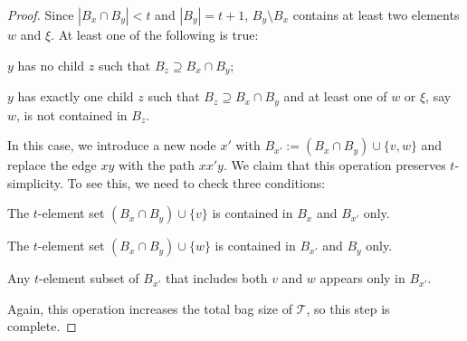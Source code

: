 \documentclass[kpfonts]{patmorin}
\theoremstyle{named}
\begin{document}
\begin{proof}
    Since $|B_x\cap B_y|<t$ and $|B_y|=t+1$, $B_y\setminus B_x$ contains at least two elements $w$ and $\xi$.  At least one of the following is true:
    \begin{inparaenum}[(i)]
        \item $y$ has no child $z$ such that $B_z\supseteq B_x\cap B_y$;
        \item $y$ has exactly one child $z$ such that $B_z\supseteq B_x\cap B_y$ and at least one of $w$ or $\xi$, say $w$, is not contained in $B_z$.
    \end{inparaenum}
    In this case, we introduce a new node $x'$ with $B_{x'}:=(B_x\cap B_y)\cup\{v,w\}$ and replace the edge $xy$ with the path $xx'y$.  We claim that this operation preserves $t$-simplicity.  To see this, we need to check three conditions:
    \begin{compactenum}
        \item The $t$-element set $(B_x\cap B_y)\cup\{v\}$ is contained in $B_x$ and $B_{x'}$ only.
        \item The $t$-element set $(B_x\cap B_y)\cup\{w\}$ is contained in $B_{x'}$ and $B_y$ only.
        \item Any $t$-element subset of $B_{x'}$ that includes both $v$ and $w$ appears only in $B_{x'}$.
    \end{compactenum}
    Again, this operation increases the total bag size of $\mathcal{T}$, so this step is complete.
\end{proof}
\end{document}
